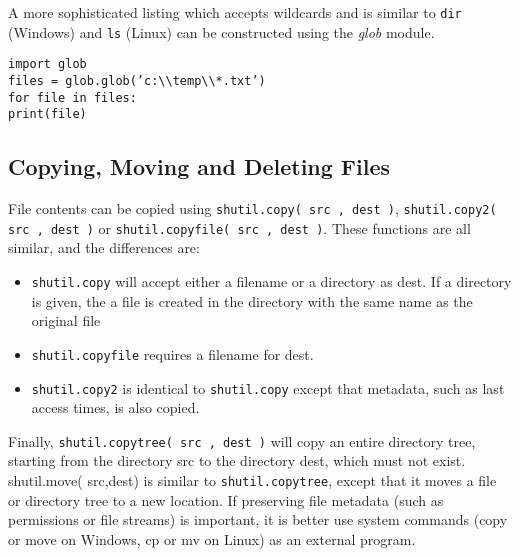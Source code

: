 \documentclass[PyData.tex]{subfiles}
\begin{document}
A more sophisticated listing which accepts wildcards and is similar to \texttt{dir} (Windows) and \texttt{ls} (Linux)
can be constructed using the \textit{glob} module.
\begin{framed}
\begin{verbatim}
import glob
files = glob.glob(’c:\\temp\\*.txt’)
for file in files:
print(file)
\end{verbatim}
\end{framed}
\subsection{ Copying, Moving and Deleting Files}
File contents can be copied using \texttt{shutil.copy( src , dest )}, \texttt{shutil.copy2( src , dest )} or \texttt{shutil.copyfile(
src , dest )}. These functions are all similar, and the differences are:
\begin{itemize}
\item \texttt{shutil.copy} will accept either a filename or a directory as dest. If a directory is given, the a file is
created in the directory with the same name as the original file
\item  \texttt{shutil.copyfile} requires a filename for dest.
\item  \texttt{shutil.copy2} is identical to \texttt{shutil.copy} except that metadata, such as last access times, is also
copied.
\end{itemize}
Finally, \texttt{shutil.copytree( src , dest )} will copy an entire directory tree, starting from the directory src to
the directory dest, which must not exist. shutil.move( src,dest) is similar to \texttt{shutil.copytree}, except that
it moves a file or directory tree to a new location. If preserving file metadata (such as permissions or file streams) is important, it is better use system commands (copy or move on Windows, cp or mv on Linux)
as an external program.
\end{document}

